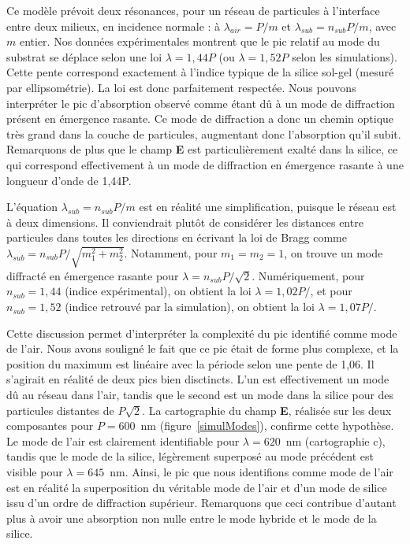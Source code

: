 Ce modèle prévoit deux résonances, pour un réseau de particules à l'interface entre deux milieux, en incidence normale : à $\lambda_{air} = P/m$ et $\lambda_{sub} = n_{sub}P/m$, avec $m$ entier. Nos données expérimentales montrent que le pic relatif au mode du substrat se déplace selon une loi $\lambda = 1,44P $ (ou $\lambda = 1, 52P$ selon les simulations). Cette pente correspond exactement à l'indice typique de la silice sol-gel (mesuré par ellipsométrie). La loi est donc parfaitement respectée. Nous pouvons interpréter le pic d'absorption observé comme étant dû à un mode de diffraction présent en émergence rasante. Ce mode de diffraction a donc un chemin optique très grand dans la couche de particules, augmentant donc l'absorption qu'il subit. Remarquons de plus que le champ \textbf{E} est particulièrement exalté dans la silice, ce qui correspond effectivement à un mode de diffraction en émergence rasante à une longueur d'onde de 1,44P.\par 
L'équation $\lambda_{sub} = n_{sub}P/m$ est en réalité une simplification, puisque le réseau est à deux dimensions. Il conviendrait plutôt de considérer les distances entre particules dans toutes les directions en écrivant la loi de Bragg comme $\lambda_{sub} = n_{sub}P/\sqrt{m_1^2+m_2^2}$. Notamment, pour $m_1=m_2=1$, on trouve un mode diffracté en émergence rasante pour $\lambda = n_{sub}P/\sqrt{2}$. Numériquement, pour $n_{sub}=1,44$ (indice expérimental), on obtient la loi $\lambda = 1,02 P/$, et pour $n_{sub}=1,52$ (indice retrouvé par la simulation), on obtient la loi $\lambda = 1,07 P/$.\par 
Cette discussion permet d'interpréter la complexité du pic identifié comme mode de l'air. Nous avons souligné le fait que ce pic était de forme plus complexe, et la position du maximum est linéaire avec la période selon une pente de 1,06. Il s'agirait en réalité de deux pics bien disctincts. L'un est effectivement un mode dû au réseau dans l'air, tandis que le second est un mode dans la silice pour des particules distantes de $P\sqrt{2}$. La cartographie du champ \textbf{E}, réalisée sur les deux composantes pour $P = 600$~nm (figure~\ref{simulModes}), confirme cette hypothèse. Le mode de l'air est clairement identifiable pour $\lambda = 620$~nm (cartographie c), tandis que le mode de la silice, légèrement superposé au mode précédent est visible pour $\lambda = 645$~nm. Ainsi, le pic que nous identifions comme \og mode de l'air \fg{} est en réalité la superposition du véritable mode de l'air et d'un mode de silice issu d'un ordre de diffraction supérieur. Remarquons que ceci contribue d'autant plus à avoir une absorption non nulle entre le mode hybride et le mode de la silice.\par 

